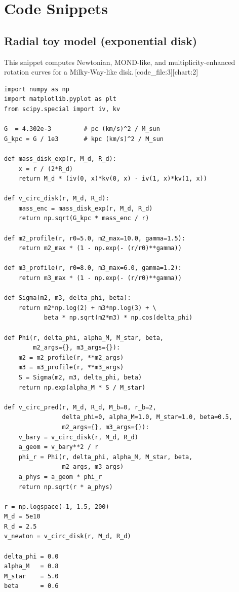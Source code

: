 \documentclass[11pt]{article}
\begin{document}
\section{Code Snippets}

\subsection{Radial toy model (exponential disk)}

This snippet computes Newtonian, MOND-like, and multiplicity-enhanced rotation curves for a Milky-Way-like disk.\,[code_file:3][chart:2]

\begin{verbatim}
import numpy as np
import matplotlib.pyplot as plt
from scipy.special import iv, kv

G  = 4.302e-3         # pc (km/s)^2 / M_sun
G_kpc = G / 1e3       # kpc (km/s)^2 / M_sun

def mass_disk_exp(r, M_d, R_d):
    x = r / (2*R_d)
    return M_d * (iv(0, x)*kv(0, x) - iv(1, x)*kv(1, x))

def v_circ_disk(r, M_d, R_d):
    mass_enc = mass_disk_exp(r, M_d, R_d)
    return np.sqrt(G_kpc * mass_enc / r)

def m2_profile(r, r0=5.0, m2_max=10.0, gamma=1.5):
    return m2_max * (1 - np.exp(- (r/r0)**gamma))

def m3_profile(r, r0=8.0, m3_max=6.0, gamma=1.2):
    return m3_max * (1 - np.exp(- (r/r0)**gamma))

def Sigma(m2, m3, delta_phi, beta):
    return m2*np.log(2) + m3*np.log(3) + \
           beta * np.sqrt(m2*m3) * np.cos(delta_phi)

def Phi(r, delta_phi, alpha_M, M_star, beta,
        m2_args={}, m3_args={}):
    m2 = m2_profile(r, **m2_args)
    m3 = m3_profile(r, **m3_args)
    S = Sigma(m2, m3, delta_phi, beta)
    return np.exp(alpha_M * S / M_star)

def v_circ_pred(r, M_d, R_d, M_b=0, r_b=2,
                delta_phi=0, alpha_M=1.0, M_star=1.0, beta=0.5,
                m2_args={}, m3_args={}):
    v_bary = v_circ_disk(r, M_d, R_d)
    a_geom = v_bary**2 / r
    phi_r = Phi(r, delta_phi, alpha_M, M_star, beta,
                m2_args, m3_args)
    a_phys = a_geom * phi_r
    return np.sqrt(r * a_phys)

r = np.logspace(-1, 1.5, 200)
M_d = 5e10
R_d = 2.5
v_newton = v_circ_disk(r, M_d, R_d)

delta_phi = 0.0
alpha_M   = 0.8
M_star    = 5.0
beta      = 0.6


\end{verbatim}
\end{document}
